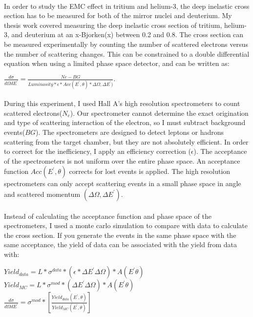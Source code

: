 \documentclass[12pt,letterpaper]{article}
\begin{document}
\paragraph{} In order to study the EMC effect in tritium and helium-3, the deep inelastic cross section has to be measured for both of the mirror nuclei and deuterium. My thesis work covered measuring the deep inelastic cross section of tritium, helium-3, and deuterium at an x-Bjorken(x) between 0.2 and 0.8. The cross section can be measured experimentally by counting the number of scattered electrons versus the number of scattering changes. This can be constrained to a double differential equation when using a limited phase space detector, and can be written as:
\begin{center}
$ \frac{d\sigma}{d\Omega dE^\prime} = \frac{Ne - BG }{Luminosity *  \epsilon * Acc(E^\prime ,\theta) * \Delta\Omega,\Delta E^\prime)} . $
 \end{center}
\paragraph{}During this experiment, I used Hall A's high resolution spectrometers to count scattered electrons($N_e$). Our spectrometer cannot determine the exact origination and type of scattering interaction of the electron, so I must subtract background events($BG$). The spectrometers are designed to detect leptons or hadrons scattering from the target chamber, but they are not absolutely efficient. In order to correct for the inefficiency, I apply an efficiency correction ($\epsilon$). The acceptance of the spectrometers is not uniform over the entire phase space. An acceptance function $Acc(E^\prime ,\theta)$ corrects for lost events is applied. The high resolution spectrometers can only accept scattering events in a small phase space in angle and scattered momentum $ (\Delta\Omega,\Delta E^\prime)$. 
\paragraph{}Instead of calculating the acceptance function and phase space of the spectrometers, I used a monte carlo simulation to compare with data to calculate the cross section. If you generate the events in the same phase space with the same acceptance, the yield of data can be associated with the yield from data with:
\begin{center}
$ Yield_{data} = \textit{L} *\sigma^{data} * \left( \epsilon*\Delta E^\prime \Delta \Omega\right)*  A \left(E^\prime \theta \right)$\\
$ Yield_{MC} = \textit{L} *\sigma^{mod} * \left( \Delta E^\prime \Delta \Omega\right)*  A \left(E^\prime \theta \right)$\\

$ \frac{d\sigma}{d\Omega dE^\prime} = \sigma^{mod} * \left[\frac{Yield_{data} \left( 
	E^\prime,\theta\right)} {Yield_{MC}\left(E^\prime,\theta\right)}\right] $
\end{center}
\end{document}
